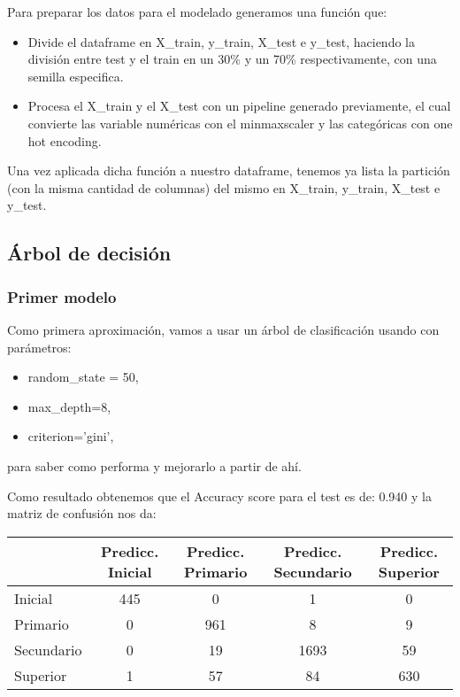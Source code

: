 \documentclass[a4paper]{article}
\begin{document}
        Para preparar los datos para el modelado generamos una función que:
        \begin{itemize}
            \item  Divide el dataframe en X\_train, y\_train, X\_test e y\_test, haciendo la división entre test y el train en un 30\% y un 70\% respectivamente, con una semilla especifica.
            \item  Procesa el X\_train y el X\_test con un pipeline generado previamente, el cual convierte las variable numéricas con el minmaxscaler y las categóricas con one hot encoding.
        \end{itemize}

        Una vez aplicada dicha función a nuestro dataframe, tenemos ya lista la partición (con la misma cantidad de columnas) del mismo en X\_train, y\_train, X\_test e y\_test.

    \subsection{Árbol de decisión}

        \subsubsection{Primer modelo}

            Como primera aproximación, vamos a usar un árbol de clasificación usando con parámetros:
            \begin{itemize}
                \item random\_state = 50,
                \item max\_depth=8,
                \item criterion='gini',
            \end{itemize}
            para saber como performa y mejorarlo a partir de ahí.

            Como resultado obtenemos que el Accuracy score para el test es de: 0.940 y la matriz de confusión nos da:
            \begin{table}[H]
                \centering
                \begin{tabular}{|l|c|c|c|c|}
                \hline
                    ~ & Predicc. Inicial & Predicc. Primario & Predicc. Secundario & Predicc. Superior \\ \hline
                    Inicial & 445 & 0 & 1 & 0 \\ \hline
                    Primario & 0 & 961 & 8 & 9 \\ \hline
                    Secundario & 0 & 19 & 1693 & 59 \\ \hline
                    Superior & 1 & 57 & 84 & 630 \\ \hline
                \end{tabular}
            \end{table}
\end{document}
